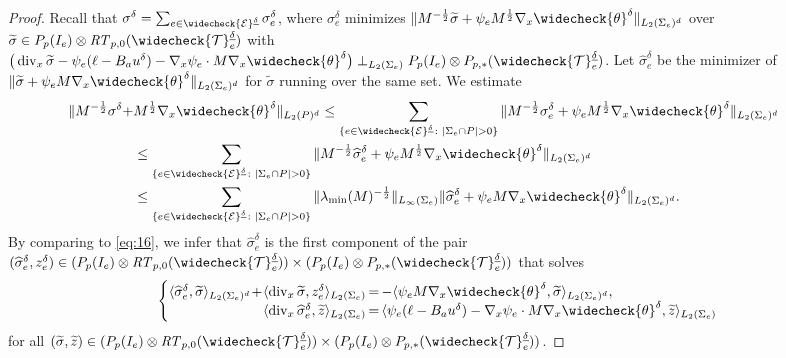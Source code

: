 \documentclass{amsart}
\numberwithin{equation}{section}
\newcommand{\cE}{\mathcal E}
\newcommand{\1}{\mathbb 1}
\DeclareMathOperator{\divv}{div}
\newcommand{\be}{\begin{equation}}
\newcommand{\ee}{\end{equation}}
\newcommand{\tria}{{\mathcal T}}
\newcommand{\RT}{\mathit{RT}}
\begin{document}
\begin{proof} Recall that $\sigma^\delta=\sum_{e \in \widecheck{\cE}^{\underline{\delta}}} \sigma_e^\delta$, where $\sigma_e^\delta$ minimizes $ \|M^{-\frac12} \widetilde{\sigma}+\psi_e M^{\frac12} \nabla_x \widecheck{\theta}^\delta\|_{L_2(\Sigma_e)^d}$ over $\widetilde{\sigma}\in P_p(I_e) \otimes \RT_{p,0}(\widecheck\tria^{\underline{\delta}}_e)$ with $\big(\divv_x \widetilde{\sigma}-\psi_e (\ell-B_a u^\delta) - \nabla_x \psi_e\cdot M \nabla_x \widecheck{\theta}^\delta\big)\perp_{L_2(\Sigma_e)}P_p(I_e) \otimes P_{p,*}(\widecheck\tria^{\underline{\delta}}_e)$.
Let $\widehat{\sigma}_e^\delta$ be the minimizer of $\|\widetilde{\sigma}+\psi_e M \nabla_x \widecheck{\theta}^\delta\|_{L_2(\Sigma_e)^d}$ for 
 $\widetilde{\sigma}$ running over the same set. We estimate
\be \label{eq:g6}
\begin{split}
\hspace*{-2em} \|M^{-\frac12} \sigma^\delta+&M^{\frac12} \nabla_x \widecheck{\theta}^\delta\|_{L_2(P)^d} \leq
 \sum_{\{e \in \widecheck{\cE}^{\underline{\delta}}\colon |\Sigma_e \cap P|>0 \}} \|M^{-\frac12} \sigma_e^\delta+\psi_e M^{\frac12} \nabla_x \widecheck{\theta}^\delta\|_{L_2(\Sigma_e)^d}\\
&\leq
 \sum_{\{e \in \widecheck{\cE}^{\underline{\delta}}\colon |\Sigma_e \cap P|>0 \}} \|M^{-\frac12} \widehat{\sigma}_e^\delta+ \psi_e M^{\frac12}\nabla_x \widecheck{\theta}^\delta\|_{L_2(\Sigma_e)^d}\\
 &\leq
 \sum_{\{e \in \widecheck{\cE}^{\underline{\delta}}\colon |\Sigma_e \cap P|>0 \}}  \|\lambda_{\min}(M)^{-\frac12}\|_{L_\infty(\Sigma_e)}
 \|\widehat{\sigma}_e^\delta+ \psi_e M\nabla_x \widecheck{\theta}^\delta\|_{L_2(\Sigma_e)^d}.
\end{split}
\ee
By comparing to \eqref{eq:16}, we infer that $\widehat{\sigma}_e^\delta$ is the first component of the pair $(\widehat{\sigma}_e^\delta,z_{e}^\delta) \in (P_p(I_e) \otimes \RT_{p,0}(\widecheck\tria^{\underline{\delta}}_e)) \times (P_p(I_e) \otimes P_{p,*}(\widecheck\tria^{\underline{\delta}}_e))$ that solves
$$
 \left\{
 \begin{array}{@{}r@{}c@{}l@{}}
 \langle \widehat{\sigma}_e^\delta, \widetilde{\sigma}\rangle_{L_2(\Sigma_e)^d}\!+\! \langle \divv_x \widetilde{\sigma}, z_{e}^\delta \rangle_{L_2(\Sigma_e)} & \,=\, & - \langle \psi_e M \nabla_x \widecheck{\theta}^\delta, \widetilde{\sigma}\rangle_{L_2(\Sigma_e)^d} ,\\
 \langle \divv_x \widehat{\sigma}_e^\delta, \widetilde{z} \rangle_{L_2(\Sigma_e)} &\,= \,& \langle \psi_e (\ell-B_a u^\delta) - \nabla_x \psi_e\cdot M \nabla_x \widecheck{\theta}^\delta, \widetilde{z}\rangle_{L_2(\Sigma_e)}
 \end{array}
 \right.
$$
for all  $(\widetilde{\sigma},\widetilde{z}) \in (P_p(I_e) \otimes\RT_{p,0}(\widecheck\tria^{\underline{\delta}}_e)) \times (P_p(I_e) \otimes P_{p,*}(\widecheck\tria^{\underline{\delta}}_e))$. 


\end{proof}
\end{document}
